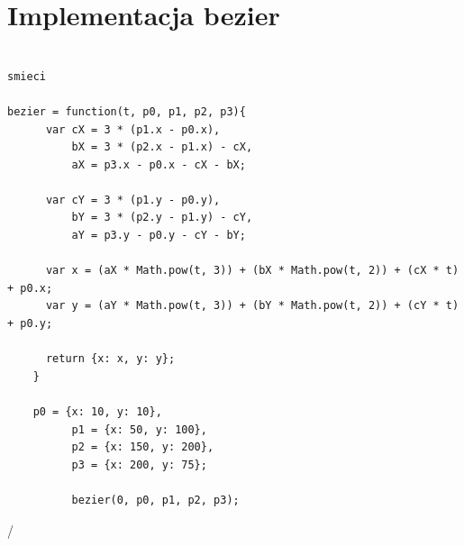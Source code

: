 \section{Implementacja bezier}
\label{sec:bezierimpl}

\lstset{language=JavaScript}
\begin{lstlisting}[label={lst:aproks},caption={Aproksymacja danych}]

smieci

bezier = function(t, p0, p1, p2, p3){
      var cX = 3 * (p1.x - p0.x),
          bX = 3 * (p2.x - p1.x) - cX,
          aX = p3.x - p0.x - cX - bX;

      var cY = 3 * (p1.y - p0.y),
          bY = 3 * (p2.y - p1.y) - cY,
          aY = p3.y - p0.y - cY - bY;

      var x = (aX * Math.pow(t, 3)) + (bX * Math.pow(t, 2)) + (cX * t) + p0.x;
      var y = (aY * Math.pow(t, 3)) + (bY * Math.pow(t, 2)) + (cY * t) + p0.y;

      return {x: x, y: y};
    }

    p0 = {x: 10, y: 10},
          p1 = {x: 50, y: 100},
          p2 = {x: 150, y: 200},
          p3 = {x: 200, y: 75};

          bezier(0, p0, p1, p2, p3);

\end{lstlisting}/
